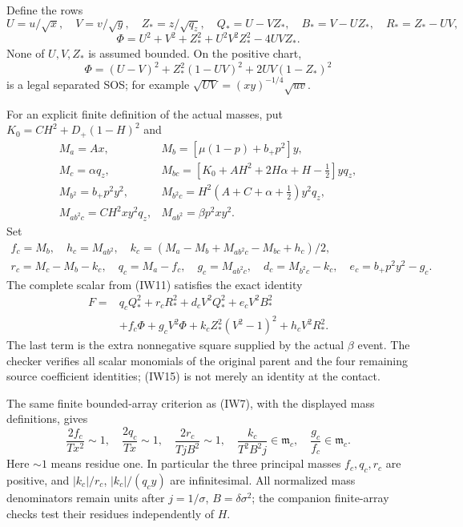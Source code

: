Define the rows
\[
 U=u/\sqrt x,\quad V=v/\sqrt y,\quad Z_*=z/\sqrt{q_z},
 \quad Q_*=U-VZ_*,\quad B_*=V-UZ_*,\quad R_*=Z_*-UV,
\]
\[
 \Phi=U^2+V^2+Z_*^2+U^2V^2Z_*^2-4UVZ_*.
\]
None of $U,V,Z_*$ is assumed bounded. On the positive chart,
\[
 \Phi=(U-V)^2+Z_*^2(1-UV)^2+2UV(1-Z_*)^2             \tag{IW14}
\]
is a legal separated SOS; for example
$\sqrt{UV}=(xy)^{-1/4}\sqrt{uv}$.

For an explicit finite definition of the actual masses, put
$K_0=CH^2+D_+(1-H)^2$ and
\[
\begin{array}{ll}
 M_a=Ax,&M_b=[\mu(1-p)+b_+p^2]y,\\
 M_c=\alpha q_z,&
 M_{bc}=[K_0+AH^2+2H\alpha+H-\tfrac12]yq_z,\\
 M_{b^2}=b_+p^2y^2,&
 M_{b^2c}=H^2(A+C+\alpha+\tfrac12)y^2q_z,\\
 M_{ab^2c}=CH^2xy^2q_z,&M_{ab^2}=\beta p^2xy^2.
\end{array}
\]
Set
\[
\begin{gathered}
 f_c=M_b,\quad h_c=M_{ab^2},\quad
 k_c=(M_a-M_b+M_{ab^2c}-M_{bc}+h_c)/2,\\
 r_c=M_c-M_b-k_c,\quad q_c=M_a-f_c,\quad
 g_c=M_{ab^2c},\quad d_c=M_{b^2c}-k_c,
 \quad e_c=b_+p^2y^2-g_c.
\end{gathered}
\]
The complete scalar from (IW11) satisfies the exact identity
\[
\begin{split}
 F={}&q_cQ_*^2+r_cR_*^2+d_cV^2Q_*^2+e_cV^2B_*^2\\
 &+f_c\Phi+g_cV^2\Phi+k_cZ_*^2(V^2-1)^2+h_cV^2R_*^2.
\end{split}                                                     \tag{IW15}
\]
The last term is the extra nonnegative square supplied by the actual
$\beta$ event. The checker verifies all scalar monomials of the
original parent and the four remaining source coefficient identities;
(IW15) is not merely an identity at the contact.

The same finite bounded-array criterion as (IW7), with the displayed
mass definitions, gives
\[
 \frac{2f_c}{Tx^2}\sim1,\quad
 \frac{2q_c}{Tx}\sim1,\quad
 \frac{2r_c}{TjB^2}\sim1,\quad
 \frac{k_c}{T^2B^2j}\in\mathfrak m_c,\quad
 \frac{g_c}{f_c}\in\mathfrak m_c.                     \tag{IW16}
\]
Here $\sim1$ means residue one. In particular the three principal
masses $f_c,q_c,r_c$ are positive, and
$|k_c|/r_c$, $|k_c|/(q_cy)$ are infinitesimal.
All normalized mass denominators remain units after
$j=1/\sigma$, $B=\delta\sigma^2$; the companion finite-array
checks test their residues independently of $H$.

